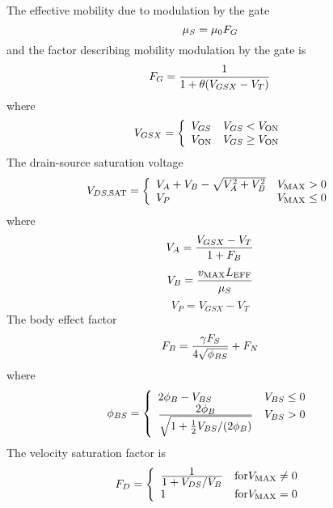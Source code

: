 The effective mobility due to modulation by the gate
\begin{equation}
\mu_S = \mu_0 F_G
\end{equation}
and the factor describing mobility modulation by the gate is
\begin{equation}
    F_G = {1 \over {1 + \theta(V_{GSX}-V_T)}}
\end{equation}
where
\begin{equation}
V_{GSX} = \left\{ \begin{array}{ll}
          V_{GS}      &  V_{GS} < V_{\ms{ON}}\\
          V_{\ms{ON}} &  V_{GS} \ge V_{\ms{ON}}
          \end{array} \right. %
\label{eqn:vgsx:l3}
\end{equation}
\clearpage
The drain-source saturation voltage
\begin{equation}
V_{DS,\ms{SAT}} = \left\{ \begin{array}{ll}
		   V_A + V_B - \sqrt{V_A^2 + V_B^2} & \VMAX > 0\\
		   V_P				    & \VMAX \le 0
		   \end{array} \right. %
\end{equation}
where
\begin{equation}
V_A = {{V_{GSX} - V_T} \over {1+F_B}}
\end{equation}
\begin{equation}
V_B = {{v_{\mbox{\scriptsize MAX}}L_{\mbox{\scriptsize EFF}}}\over{\mu_S}}
\end{equation}
\begin{equation}
V_P = V_{GSX} - V_T
\end{equation}
The body effect factor
\begin{equation}
F_B = {{\gamma F_S} \over {4 \sqrt{\phi_{BS}}}} + F_N
\label{eqn:fb:l3}
\end{equation}
where
\begin{equation}
\phi_{BS} = \left\{ \begin{array}{ll}
            \PHI - V_{BS}    &  V_{BS} \le 0\\
            {{\textstyle \PHI}\over{\textstyle\sqrt{1+\frac{1}{2}V_{BS}/
                 (\PHI)}}}    & V_{BS} > 0
		   \end{array} \right. %
\end{equation}
The velocity saturation factor is
\begin{equation}
    F_D = \left\{ \begin{array}{ll}
          {{\textstyle 1} \over {\textstyle 1 + V_{DS}/V_B}}
					  & \mbox{for} \VMAX \ne 0 \\
           1                              & \mbox{for} \VMAX = 0
	   \end{array} \right. %
\end{equation}
